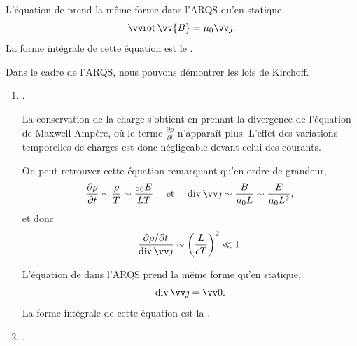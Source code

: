 \documentclass[12pt,fancy]{cours}
\begin{document}
\begin{theorem}\label{form:}
L’équation de  prend la même forme dans l’ARQS qu’en statique,
$$
\rot{\vv{B}}=\mu_0\j.
$$
La forme intégrale de cette équation est le .

\end{theorem}

 Dans le cadre de l’ARQS, nous pouvons démontrer les lois de Kirchoff.

\begin{enumerate}
  \item {}.
  
  La conservation de la charge s’obtient en prenant la divergence de l'équation de Maxwell-Ampère,
où le terme $\frac{\partial \rho}{\partial t}$ n'apparaît plus. 
L’effet des variations temporelles de charges est donc négligeable devant celui des courants. 
\begin{remarque}
  On peut retrouver cette équation remarquant qu’en ordre de grandeur,
\begin{equation}
\frac{\partial \rho}{\partial t} \sim \frac{\rho}{T} \sim \frac{\epz E}{L T} \quad \text{ et } \quad \dive{\j} \sim \frac{B}{\mu_0 L} \sim \frac{E}{\mu_0 L^2},
\end{equation}
et donc 
\begin{equation}
\frac{\partial{\rho} / {\partial t}}{\dive{\j}} \sim \left(\frac{L}{cT}\right)^2 \ll 1.
\end{equation}
\end{remarque}

\begin{theorem}\label{form:}
L’équation de  dans l’ARQS prend la même forme qu’en statique,
$$
\dive \j = \Vec{0}.
$$
La forme intégrale de cette équation est la .
\end{theorem}

\item {}.


\end{enumerate}
\end{document}
